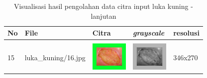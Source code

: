 \begin{table}[H]
	\centering
	\caption{Visualisasi hasil pengolahan data citra input luka kuning - lanjutan}
	\label{tabel_input_7}
	\begin{tabular}{|m{0.2in}|m{1.2in}|m{0.7in}|m{0.7in}|m{0.7in}|}
		\hline
		\textbf{No} & \textbf{File} & \textbf{Citra} & \textbf{\emph{grayscale}} & \textbf{resolusi} \\
		\hline
		
		& &  &  &\\
		15 & 
		luka\_kuning/16.jpg &
		\includegraphics[width=0.7in]{dataset/dataset_3/luka_kuning/ready/16.jpg}&
		\includegraphics[width=0.7in]{dataset/dataset_3/luka_kuning/ready/16_gray.jpg}&
		346x270\\
		\hline
	\end{tabular}
\end{table}


